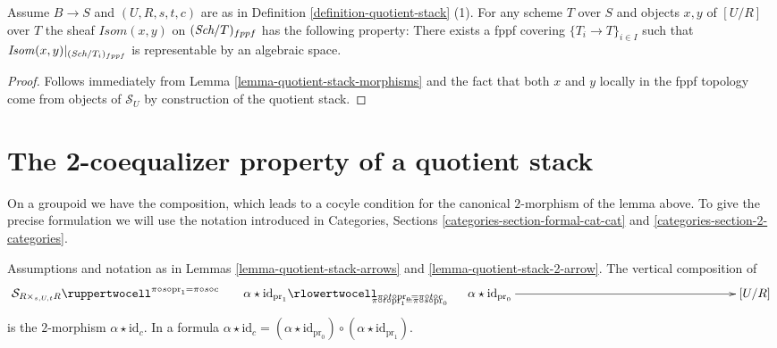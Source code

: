 \begin{lemma}
\label{lemma-quotient-stack-isom}
Assume $B \to S$ and $(U, R, s, t, c)$ are as in
Definition \ref{definition-quotient-stack} (1).
For any scheme $T$ over $S$ and objects $x, y$ of $[U/R]$ over $T$
the sheaf $\mathit{Isom}(x, y)$ on $(\textit{Sch}/T)_{fppf}$ has
the following property: There exists a fppf covering
$\{T_i \to T\}_{i \in I}$ such that
$\mathit{Isom}(x, y)|_{(\textit{Sch}/T_i)_{fppf}}$
is representable by an algebraic space.
\end{lemma}

\begin{proof}
Follows immediately from
Lemma \ref{lemma-quotient-stack-morphisms}
and the fact that both $x$ and $y$ locally in the fppf
topology come from objects of $\mathcal{S}_U$ by construction
of the quotient stack.
\end{proof}














\section{The 2-coequalizer property of a quotient stack}
\label{section-quotient-stacks-2-coequalize}

\noindent
On a groupoid we have the composition, which leads to a cocyle
condition for the canonical $2$-morphism of the lemma above.
To give the precise formulation we will use the notation introduced in
Categories, Sections \ref{categories-section-formal-cat-cat} and
\ref{categories-section-2-categories}.

\begin{lemma}
\label{lemma-quotient-stack-cocycle}
Assumptions and notation as in
Lemmas \ref{lemma-quotient-stack-arrows} and
\ref{lemma-quotient-stack-2-arrow}.
The vertical composition of
$$
\xymatrixcolsep{15pc}
\xymatrix{
\mathcal{S}_{R \times_{s, U, t} R}
\ruppertwocell^{\pi \circ s \circ \text{pr}_1 = \pi \circ s \circ c}%
{\ \ \ \ \ \ \alpha \star \text{id}_{\text{pr}_1}}
\ar[r]_(.3){\pi \circ t \circ \text{pr}_1 = \pi \circ s \circ \text{pr}_0}
\rlowertwocell_{\pi \circ t \circ \text{pr}_0 = \pi \circ t \circ c}%
{\ \ \ \ \ \ \alpha \star \text{id}_{\text{pr}_0}}
&
[U/R]
}
$$
is the $2$-morphism $\alpha \star \text{id}_c$. In a formula
$\alpha \star \text{id}_c =
(\alpha \star \text{id}_{\text{pr}_0})
\circ
(\alpha \star \text{id}_{\text{pr}_1})
$.
\end{lemma}

